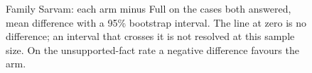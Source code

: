 \begin{figure}[!t]
\caption{Family Sarvam: each arm minus Full on the cases both answered, mean difference with a 95\% bootstrap interval. The line at zero is no difference; an interval that crosses it is not resolved at this sample size. On the unsupported-fact rate a negative difference favours the arm.}
\label{fig:forest_sarvam}
\end{figure}